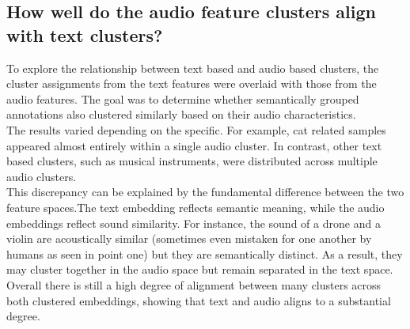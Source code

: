 \subsection{How well do the audio feature clusters align with text clusters?}
\label{sec:Text Features:c}


To explore the relationship between text based and audio based clusters, the cluster assignments from the text features were overlaid with those from the audio features. The goal was to determine whether semantically grouped annotations also clustered similarly based on their audio characteristics.\\
The results varied depending on the specific. For example, cat related samples appeared almost entirely within a single audio cluster. In contrast, other text based clusters, such as musical instruments, were distributed across multiple audio clusters.\\
This discrepancy can be explained by the fundamental difference between the two feature spaces.The text embedding reflects semantic meaning, while the audio embeddings reflect sound similarity. For instance, the sound of a drone and a violin are acoustically similar (sometimes even mistaken for one another by humans as seen in point one) but they are semantically distinct. As a result, they may cluster together in the audio space but remain separated in the text space.\\
Overall there is still a high degree of alignment between many clusters across both clustered embeddings, showing that text and audio aligns to a substantial degree.



\newpage





